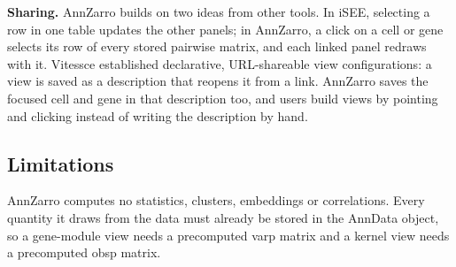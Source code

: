 \textbf{Sharing.} AnnZarro builds on two ideas from other tools. In iSEE\cite{ruealbrecht2018}, selecting a row in one table updates the other panels; in AnnZarro, a click on a cell or gene selects its row of every stored pairwise matrix, and each linked panel redraws with it. Vitessce established declarative, URL-shareable view configurations\cite{keller2025}: a view is saved as a description that reopens it from a link. AnnZarro saves the focused cell and gene in that description too, and users build views by pointing and clicking instead of writing the description by hand.


\figscale

\subsection{Limitations}

AnnZarro computes no statistics, clusters, embeddings or correlations. Every quantity it draws from the data must already be stored in the AnnData object, so a gene-module view needs a precomputed varp matrix and a kernel view needs a precomputed obsp matrix.

